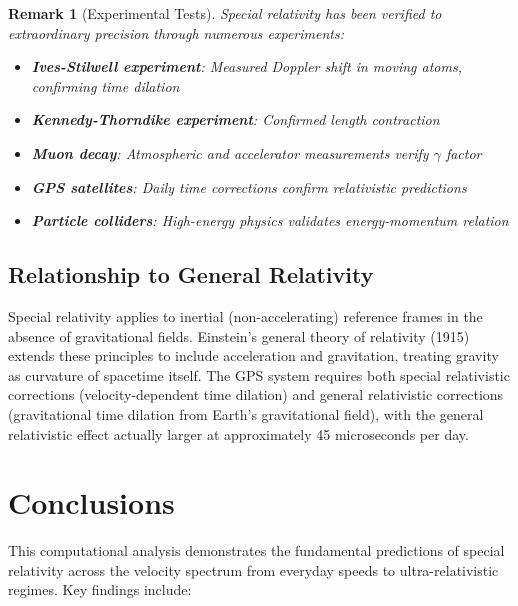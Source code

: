 \documentclass[a4paper, 11pt]{article}
\newtheorem{remark}{Remark}[section]
\begin{document}
\begin{remark}[Experimental Tests]
Special relativity has been verified to extraordinary precision through numerous experiments:
\begin{itemize}
\item \textbf{Ives-Stilwell experiment}: Measured Doppler shift in moving atoms, confirming time dilation
\item \textbf{Kennedy-Thorndike experiment}: Confirmed length contraction
\item \textbf{Muon decay}: Atmospheric and accelerator measurements verify $\gamma$ factor
\item \textbf{GPS satellites}: Daily time corrections confirm relativistic predictions
\item \textbf{Particle colliders}: High-energy physics validates energy-momentum relation
\end{itemize}
\end{remark}

\subsection{Relationship to General Relativity}

Special relativity applies to inertial (non-accelerating) reference frames in the absence
of gravitational fields. Einstein's general theory of relativity (1915) extends these
principles to include acceleration and gravitation, treating gravity as curvature of
spacetime itself. The GPS system requires both special relativistic corrections (velocity-dependent
time dilation) and general relativistic corrections (gravitational time dilation from
Earth's gravitational field), with the general relativistic effect actually larger at
approximately 45 microseconds per day.

\section{Conclusions}

This computational analysis demonstrates the fundamental predictions of special relativity
across the velocity spectrum from everyday speeds to ultra-relativistic regimes. Key findings include:
\end{document}
